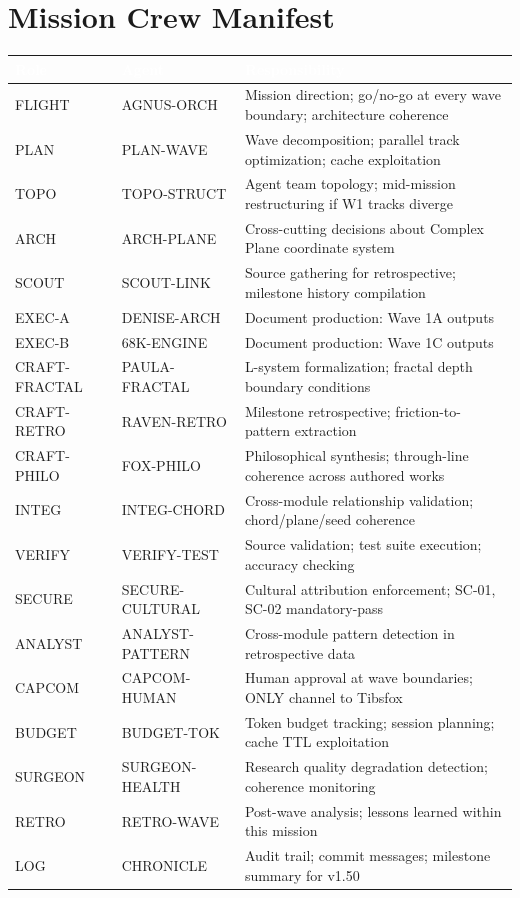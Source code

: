 \documentclass[11pt,letterpaper]{article}
\newcommand{\tableheader}[1]{\textbf{\sffamily\textcolor{white}{#1}}}
\begin{document}
\section{Mission Crew Manifest}

\begin{center}
\begin{tabularx}{\textwidth}{L{2cm}L{3.5cm}X}
\toprule
{}
\tableheader{Role} & \tableheader{Agent} & \tableheader{Responsibility} \\
\midrule
FLIGHT & AGNUS-ORCH & Mission direction; go/no-go at every wave boundary; architecture coherence \\
PLAN & PLAN-WAVE & Wave decomposition; parallel track optimization; cache exploitation \\
TOPO & TOPO-STRUCT & Agent team topology; mid-mission restructuring if W1 tracks diverge \\
ARCH & ARCH-PLANE & Cross-cutting decisions about Complex Plane coordinate system \\
SCOUT & SCOUT-LINK & Source gathering for retrospective; milestone history compilation \\
EXEC-A & DENISE-ARCH & Document production: Wave 1A outputs \\
EXEC-B & 68K-ENGINE & Document production: Wave 1C outputs \\
CRAFT-FRACTAL & PAULA-FRACTAL & L-system formalization; fractal depth boundary conditions \\
CRAFT-RETRO & RAVEN-RETRO & Milestone retrospective; friction-to-pattern extraction \\
CRAFT-PHILO & FOX-PHILO & Philosophical synthesis; through-line coherence across authored works \\
INTEG & INTEG-CHORD & Cross-module relationship validation; chord/plane/seed coherence \\
VERIFY & VERIFY-TEST & Source validation; test suite execution; accuracy checking \\
SECURE & SECURE-CULTURAL & Cultural attribution enforcement; SC-01, SC-02 mandatory-pass \\
ANALYST & ANALYST-PATTERN & Cross-module pattern detection in retrospective data \\
CAPCOM & CAPCOM-HUMAN & Human approval at wave boundaries; ONLY channel to Tibsfox \\
BUDGET & BUDGET-TOK & Token budget tracking; session planning; cache TTL exploitation \\
SURGEON & SURGEON-HEALTH & Research quality degradation detection; coherence monitoring \\
RETRO & RETRO-WAVE & Post-wave analysis; lessons learned within this mission \\
LOG & CHRONICLE & Audit trail; commit messages; milestone summary for v1.50 \\
\bottomrule
\end{tabularx}
\end{center}
\end{document}
